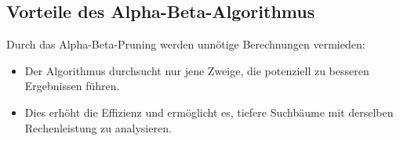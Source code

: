 \subsection*{Vorteile des Alpha-Beta-Algorithmus}

Durch das Alpha-Beta-Pruning werden unnötige Berechnungen vermieden:
\begin{itemize}
	\item Der Algorithmus durchsucht nur jene Zweige, die potenziell zu besseren Ergebnissen führen.
	\item Dies erhöht die Effizienz und ermöglicht es, tiefere Suchbäume mit derselben Rechenleistung zu analysieren\autocites{monien_alphabeta-algorithmus_2008}.
\end{itemize}